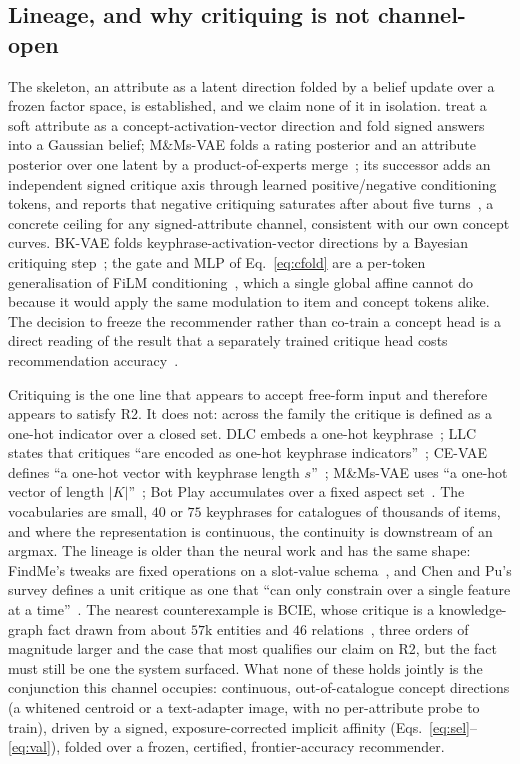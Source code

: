 \documentclass[manuscript,screen,review]{acmart}
\begin{document}
\subsection{Lineage, and why critiquing is not channel-open}\label{sec:concept:lineage}

The skeleton, an attribute as a latent direction folded by a belief update over a frozen factor space, is established, and we claim none of it in isolation. \citet{biyik2023soft} treat a soft attribute as a concept-activation-vector direction and fold signed answers into a Gaussian belief; M\&Ms-VAE folds a rating posterior and an attribute posterior over one latent by a product-of-experts merge~\citep{antognini2021mmvae}; its successor adds an independent signed critique axis through learned positive/negative conditioning tokens, and reports that negative critiquing saturates after about five turns~\citep{antognini2022posneg}, a concrete ceiling for any signed-attribute channel, consistent with our own concept curves. BK-VAE folds keyphrase-activation-vector directions by a Bayesian critiquing step~\citep{yang2021bkvae}; the gate and MLP of Eq.~\eqref{eq:cfold} are a per-token generalisation of FiLM conditioning~\citep{perez2018film}, which a single global affine cannot do because it would apply the same modulation to item and concept tokens alike. The decision to freeze the recommender rather than co-train a concept head is a direct reading of the result that a separately trained critique head costs recommendation accuracy~\citep{wu2019dlc,luo2020cevae}.

Critiquing is the one line that appears to accept free-form input and therefore appears to satisfy R2. It does not: across the family the critique is defined as a one-hot indicator over a closed set. DLC embeds a one-hot keyphrase~\citep{wu2019dlc}; LLC states that critiques ``are encoded as one-hot keyphrase indicators''~\citep{luo2020llc}; CE-VAE defines ``a one-hot vector with keyphrase length $s$''~\citep{luo2020cevae}; M\&Ms-VAE uses ``a one-hot vector of length $|K|$''~\citep{antognini2021mmvae}; Bot Play accumulates over a fixed aspect set~\citep{li2021botplay}. The vocabularies are small, $40$ or $75$ keyphrases for catalogues of thousands of items, and where the representation is continuous, the continuity is downstream of an argmax. The lineage is older than the neural work and has the same shape: FindMe's tweaks are fixed operations on a slot-value schema~\citep{burke1996findme}, and Chen and Pu's survey defines a unit critique as one that ``can only constrain over a single feature at a time''~\citep{chenpu2012critiquing}. The nearest counterexample is BCIE, whose critique is a knowledge-graph fact drawn from about $57$k entities and $46$ relations~\citep{toroghi2023bcie}, three orders of magnitude larger and the case that most qualifies our claim on R2, but the fact must still be one the system surfaced. What none of these holds jointly is the conjunction this channel occupies: continuous, out-of-catalogue concept directions (a whitened centroid or a text-adapter image, with no per-attribute probe to train), driven by a signed, exposure-corrected implicit affinity (Eqs.~\eqref{eq:sel}--\eqref{eq:val}), folded over a frozen, certified, frontier-accuracy recommender.
\end{document}
